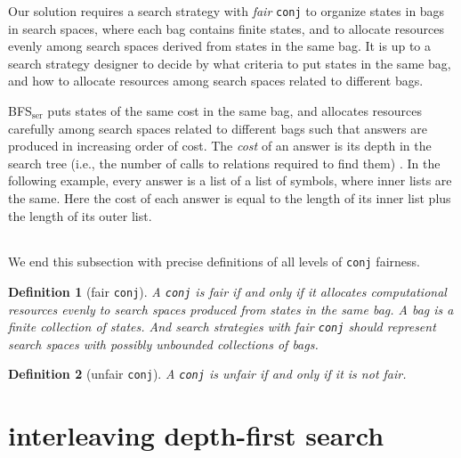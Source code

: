 \documentclass[format=acmlarge, review=true, authordraft=true]{acmart}
\newcommand{\conj}{\texttt{conj}}
\newcommand{\BFSser}[0]{BFS$_\textrm{ser}$}
\newtheorem{defn}{Definition}[section]
\begin{document}
Our solution requires a search strategy with \emph{fair} \conj{} to organize
states in bags in search spaces, where each bag contains finite states, and 
to allocate resources evenly among search spaces derived from states in the 
same bag. It is up to a search strategy designer to decide by what criteria to 
put states in the same bag, and how to allocate resources among search spaces 
related to different bags.

\BFSser{} puts states of the same cost in the same bag, and allocates
resources carefully among search spaces related to different bags such
that answers are produced in increasing order of cost. The \emph{cost}
of an answer is its depth in the search tree (i.e., the number of
calls to relations required to find them) \citep{seres1999algebra}. In
the following example, every answer is a list of a list of symbols,
where inner lists are the same. Here the cost of each answer is equal
to the length of its inner list plus the length of its outer list.

\begin{center}
	\begin{tabular}{c}
		
	\end{tabular}
\end{center}

We end this subsection with precise definitions of all levels of \conj{} 
fairness. 


\begin{defn}[fair \conj{}]
A \conj{} is fair if and only if it allocates computational resources evenly to 
search spaces produced from states in the same bag. A bag is a finite 
collection of states. And search strategies with fair \conj{} should represent 
search spaces with possibly unbounded collections of bags. 
\end{defn}

\begin{defn}[unfair \conj{}]
A \conj{} is unfair if and only if it is not fair.
\end{defn}





\section{interleaving depth-first search}
\end{document}
